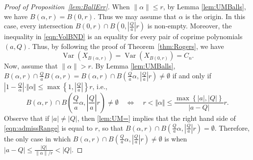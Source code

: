 \documentclass[11pt,a4paper,reqno]{amsart}
\theoremstyle{definition}
\theoremstyle{remark}
\numberwithin{equation}{section}
\begin{document}
\begin{proof}[Proof of Proposition~\ref{lem:BallErr}]
When $\|\alpha\|\le r$, by Lemma \ref{lem:UMBalls}, we have $B(\alpha, r)=B(0, r)$. Thus we may assume that $\alpha$ is the origin. In this case, every intersection $B(0,r)\cap B\left(0, \left|\frac Q a\right| r\right)$ is non-empty. Moreover, the inequality in \eqref{eqn:VolBND} is an equality for every pair of coprime polynomials $(a,Q)$. Thus, by following the proof of Theorem~\ref{thm:Rogers}, we have
$$\operatorname{Var}(X_{B(\alpha, r)})
=\operatorname{Var}(X_{B(0, r)})
=C_n.$$
\vspace{0.1in}
Now, assume that $\|\alpha\|>r$. By Lemma \ref{lem:UMBalls},  $B(\alpha,r)\cap \frac{Q}{a}B(\alpha,r)=B(\alpha,r)\cap B\left(\frac{Q}{a}\alpha,\left|\frac{Q}{a}\right|r\right)\neq \emptyset$ if and only if $\left|1-\frac{Q}{\alpha}\right|\cdot \Vert \alpha\Vert\leq \max\left\{1,\left|\frac{Q}{a}\right|\right\}r$, i.e.,
\begin{equation}\label{eqn:admissRange}
B(\alpha,r)\cap B\left(\frac{Q}{a}\alpha,\left|\frac{Q}{a}\right|r\right)\neq \emptyset
\quad\Leftrightarrow\quad
r<\Vert \alpha\Vert\leq \frac{\max\left\{|a|,\left|{Q}\right|\right\}}{\left|a-{Q}\right|}r.
\end{equation}
Observe that if $|a|\neq \left|{Q}\right|$, then \eqref{lem:UM=} implies that the right hand side of \eqref{eqn:admissRange} is equal to $r$, so that $B(\alpha,r)\cap B\left(\frac{Q}{a}\alpha,\left|\frac{Q}{a}\right|r\right)=\emptyset$. Therefore, the only case in which $B\left(\alpha,r\right)\cap B\left(\frac{Q}{a}\alpha,\left|\frac{Q}{a}\right|r\right)\neq \emptyset$ is when $\left|a-Q\right|\le\frac {|Q|}{\|\alpha\|/r}<\vert Q\vert$.


\end{proof}
\end{document}
